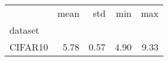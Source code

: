 \begin{tabular}{lrrrr}
\toprule
 & mean & std & min & max \\
dataset &  &  &  &  \\
\midrule
CIFAR10 & 5.78 & 0.57 & 4.90 & 9.33 \\
\bottomrule
\end{tabular}

